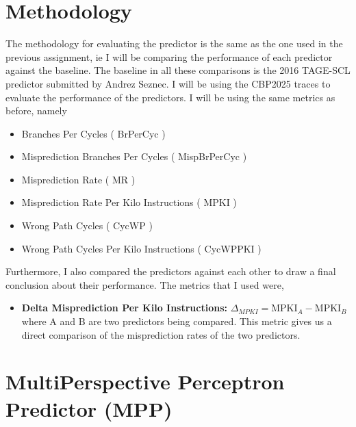 \documentclass[11pt,a4paper]{article}
\begin{document}
\section{Methodology}
The methodology for evaluating the predictor is the same as the one used in the previous assignment, ie I will be comparing
the performance of each predictor against the baseline. The baseline in all these comparisons is the 2016 TAGE-SCL predictor
submitted by Andrez Seznec. I will be using the CBP2025 traces to evaluate the performance of the predictors. I will be using the same metrics as before, namely
\begin{itemize}
        \item Branches Per Cycles ( BrPerCyc )
        \item Misprediction Branches Per Cycles ( MispBrPerCyc )
        \item Misprediction Rate ( MR )
        \item Misprediction Rate Per Kilo Instructions ( MPKI )
        \item Wrong Path Cycles ( CycWP )
        \item Wrong Path Cycles Per Kilo Instructions ( CycWPPKI ) 
\end{itemize}

Furthermore, I also compared the predictors against each other to draw a final conclusion about their performance. The metrics that I used were,
\begin{itemize}
        \item \textbf{Delta Misprediction Per Kilo Instructions:} $\Delta_{MPKI} = {\text{MPKI}_A - \text{MPKI}_B}$ \newline
        where A and B are two predictors being compared. This metric gives us a direct comparison of the misprediction rates of the two predictors.
\end{itemize}

\section{MultiPerspective Perceptron Predictor (MPP)}
\end{document}
